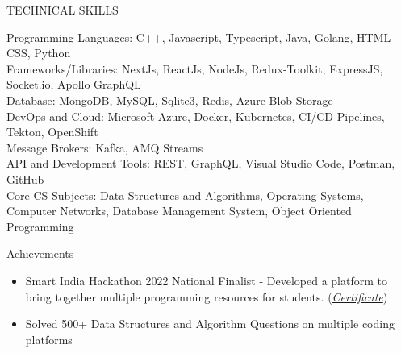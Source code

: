 \documentclass{resume} %
\begin{document}
\begin{rSection}{TECHNICAL SKILLS}




Programming Languages: {\normalfont C++, Javascript, Typescript, Java, Golang, HTML CSS, Python}
\\
Frameworks/Libraries: {\normalfont NextJs, ReactJs, NodeJs, Redux-Toolkit, ExpressJS,  Socket.io, Apollo GraphQL}
 \\
 Database: {\normalfont MongoDB, MySQL, Sqlite3, Redis, Azure Blob Storage}
 \\
 DevOps and Cloud: {\normalfont Microsoft Azure, Docker, Kubernetes, CI/CD Pipelines, Tekton, OpenShift}
 \\
 Message Brokers: {\normalfont Kafka, AMQ Streams}  
 \\
 API and Development Tools: {\normalfont REST, GraphQL, Visual Studio Code, Postman, GitHub}
 \\
 Core CS Subjects: {\normalfont Data Structures and Algorithms, Operating Systems, Computer Networks, Database Management System, Object Oriented Programming}

\end{rSection}


\begin{rSection}{Achievements}

\begin{itemize}
   \item {Smart India Hackathon 2022 National Finalist} - {\normalfont Developed a platform to bring together multiple programming resources for students. }{\normalfont (\href{https://drive.google.com/file/d/1No-u1sUaclG-nf7_Gtym5JDEz1ydyRSL/view?usp=sharing}{\emph{Certificate}})}
    \item { {\normalfont Solved} 500+ {\normalfont Data Structures and Algorithm Questions on multiple coding platforms}  }
\end{itemize}
\end{rSection}






\end{document}
